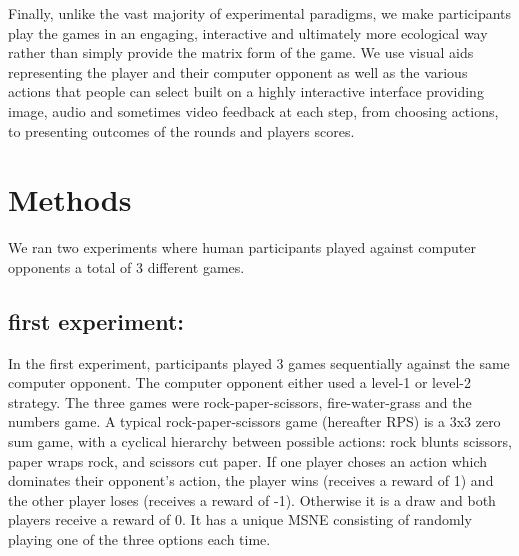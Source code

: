 \documentclass[man,floatsintext]{apa6}
\begin{document}
Finally, unlike the vast majority of experimental paradigms, we make participants play the games in an engaging, interactive and ultimately more ecological way rather than simply provide the matrix form of the game. We use visual aids representing the player and their computer opponent as well as the various actions that people can select built on a highly interactive interface providing image, audio and sometimes video feedback at each step, from choosing actions, to presenting outcomes of the rounds and players scores.

\hypertarget{methods}{%
\section{Methods}\label{methods}}

We ran two experiments where human participants played against computer opponents a total of 3 different games.

\hypertarget{first-experiment}{%
\subsection{first experiment:}\label{first-experiment}}

In the first experiment, participants played 3 games sequentially against the same computer opponent. The computer opponent either used a level-1 or level-2 strategy. The three games were rock-paper-scissors, fire-water-grass and the numbers game. A typical rock-paper-scissors game (hereafter RPS) is a 3x3 zero sum game, with a cyclical hierarchy between possible actions: rock blunts scissors, paper wraps rock, and scissors cut paper. If one player choses an action which dominates their opponent's action, the player wins (receives a reward of 1) and the other player loses (receives a reward of -1). Otherwise it is a draw and both players receive a reward of 0. It has a unique MSNE consisting of randomly playing one of the three options each time.
\end{document}
